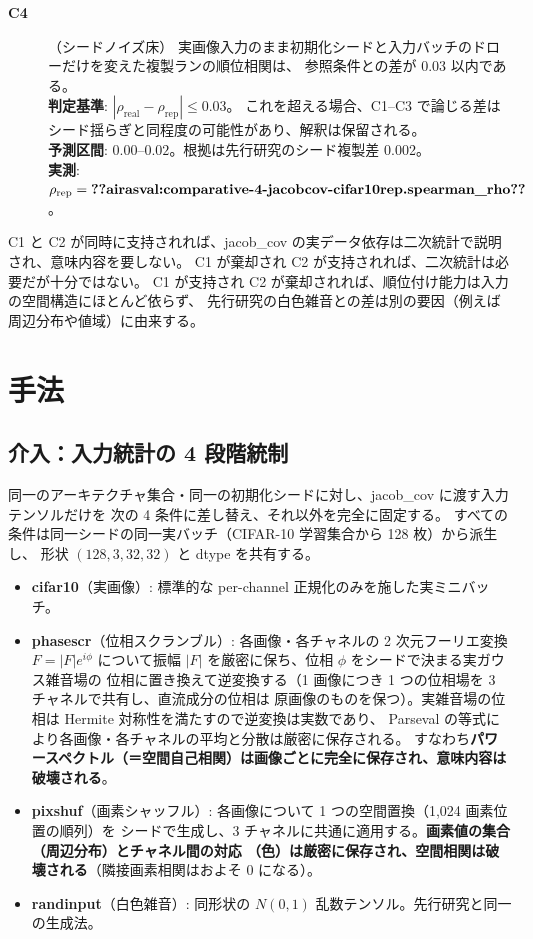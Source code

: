\documentclass[11pt]{article}
\providecommand{\airasval}[1]{\textbf{??airasval:\detokenize{#1}??}}
\providecommand{\unverified}[1]{#1}
\begin{document}
\begin{description}
\item[\textbf{C4}]（シードノイズ床）
実画像入力のまま初期化シードと入力バッチのドローだけを変えた複製ランの順位相関は、
参照条件との差が 0.03 以内である。\\
\textbf{判定基準}: $|\rho_{\mathrm{real}} - \rho_{\mathrm{rep}}| \le 0.03$。
これを超える場合、C1--C3 で論じる差はシード揺らぎと同程度の可能性があり、解釈は保留される。\\
\textbf{予測区間}: $0.00$--$0.02$。根拠は先行研究のシード複製差 \unverified{0.002}。\\
\textbf{実測}: $\rho_{\mathrm{rep}} = \airasval{comparative-4-jacobcov-cifar10rep.spearman_rho}$。

\end{description}

C1 と C2 が同時に支持されれば、jacob\_cov の実データ依存は二次統計で説明され、意味内容を要しない。
C1 が棄却され C2 が支持されれば、二次統計は必要だが十分ではない。
C1 が支持され C2 が棄却されれば、順位付け能力は入力の空間構造にほとんど依らず、
先行研究の白色雑音との差は別の要因（例えば周辺分布や値域）に由来する。

\section{手法}

\subsection{介入：入力統計の 4 段階統制}
\label{sec:method}

同一のアーキテクチャ集合・同一の初期化シードに対し、jacob\_cov に渡す入力テンソルだけを
次の 4 条件に差し替え、それ以外を完全に固定する。
すべての条件は同一シードの同一実バッチ（CIFAR-10 学習集合から 128 枚）から派生し、
形状 $(128, 3, 32, 32)$ と dtype を共有する。

\begin{itemize}
\item \textbf{cifar10}（実画像）: 標準的な per-channel 正規化のみを施した実ミニバッチ。
\item \textbf{phasescr}（位相スクランブル）: 各画像・各チャネルの 2 次元フーリエ変換
$F = |F| e^{i\phi}$ について振幅 $|F|$ を厳密に保ち、位相 $\phi$ をシードで決まる実ガウス雑音場の
位相に置き換えて逆変換する（1 画像につき 1 つの位相場を 3 チャネルで共有し、直流成分の位相は
原画像のものを保つ）。実雑音場の位相は Hermite 対称性を満たすので逆変換は実数であり、
Parseval の等式により各画像・各チャネルの平均と分散は厳密に保存される。
すなわち\textbf{パワースペクトル（＝空間自己相関）は画像ごとに完全に保存され、意味内容は破壊される}。
\item \textbf{pixshuf}（画素シャッフル）: 各画像について 1 つの空間置換（1{,}024 画素位置の順列）を
シードで生成し、3 チャネルに共通に適用する。\textbf{画素値の集合（周辺分布）とチャネル間の対応
（色）は厳密に保存され、空間相関は破壊される}（隣接画素相関はおよそ 0 になる）。
\item \textbf{randinput}（白色雑音）: 同形状の $N(0,1)$ 乱数テンソル。先行研究と同一の生成法。
\end{itemize}
\end{document}

